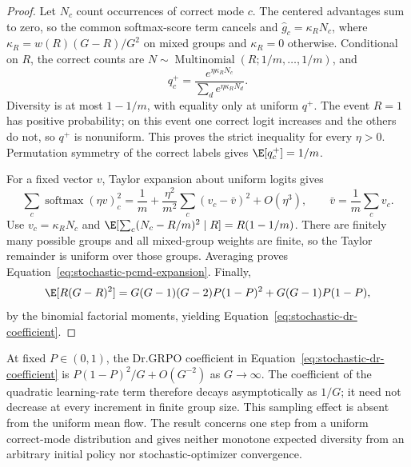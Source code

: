 \begin{proof}
\enforcehalffinalproseline
Let $N_c$ count occurrences of correct mode $c$. The centered advantages
sum to zero, so the common softmax-score term cancels and
$\widehat g_c=\kappa_RN_c$, where
$\kappa_R=w(R)(G-R)/G^2$ on mixed groups and $\kappa_R=0$ otherwise.
Conditional on $R$, the correct counts are
$N\sim\operatorname{Multinomial}(R;1/m,\ldots,1/m)$, and
\[
 q_c^+=\frac{e^{\eta\kappa_RN_c}}{\sum_de^{\eta\kappa_RN_d}}.
\]
Diversity is at most $1-1/m$, with equality only at uniform $q^+$.
The event $R=1$ has positive probability; on this event one correct logit
increases and the others do not, so $q^+$ is nonuniform. This proves the
strict inequality for every $\eta>0$. Permutation symmetry of the correct
labels gives $\E[q_c^+]=1/m$.

For a fixed vector $v$, Taylor expansion about uniform logits gives
\[
 \sum_c\operatorname{softmax}(\eta v)_c^2
 =\frac1m+\frac{\eta^2}{m^2}\sum_c(v_c-\bar v)^2+O(\eta^3),
 \qquad \bar v=\frac1m\sum_cv_c.
\]
Use $v_c=\kappa_RN_c$ and
$\E[\sum_c(N_c-R/m)^2\mid R]=R(1-1/m)$.
There are finitely many possible groups and all mixed-group weights are
finite, so the Taylor remainder is uniform over those groups. Averaging
proves Equation~\eqref{eq:stochastic-pcmd-expansion}.
Finally,
\[
 \E[R(G-R)^2]
 =G(G-1)(G-2)P(1-P)^2+G(G-1)P(1-P),
\]
by the binomial factorial moments, yielding
Equation~\eqref{eq:stochastic-dr-coefficient}.
\end{proof}

At fixed $P\in(0,1)$, the Dr.GRPO coefficient in
Equation~\eqref{eq:stochastic-dr-coefficient} is
$P(1-P)^2/G+O(G^{-2})$ as $G\to\infty$. The coefficient of the
quadratic learning-rate term therefore decays asymptotically as $1/G$;
it need not decrease at every increment in finite group size. This sampling
effect is absent from the uniform mean flow. The result concerns one step
from a uniform correct-mode distribution and gives neither monotone expected
diversity from an arbitrary initial policy nor stochastic-optimizer convergence.

